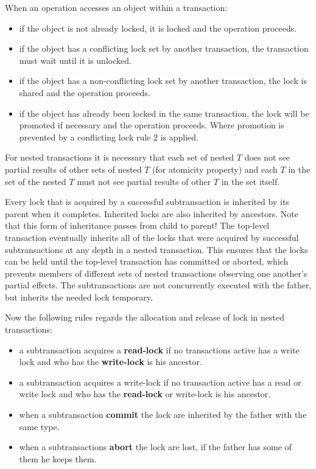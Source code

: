When an operation accesses an object within a transaction:
\begin{itemize}
	\item if the object is not already locked, it is locked and the operation proceeds.
	\item if the object has a conflicting lock set by another transaction, the transaction must wait until it is unlocked.
	\item if the object has a non-conflicting lock set by another transaction, the lock is shared and the operation proceeds.
	\item if the object has already been locked in the same transaction, the lock will be promoted if necessary and the operation proceeds. Where promotion is prevented by a conflicting lock rule $2$ is applied.
\end{itemize}

For nested transactions it is necessary that each set of nested $T$ does not see partial results of other sets of nested $T$ (for atomicity property) and each $T$ in the set of the nested $T$ must not see partial results of other $T$ in the set itself.

Every lock that is acquired by a successful subtransaction is inherited by its parent when it completes. Inherited locks are also inherited by ancestors. Note that this form of inheritance passes from child to parent! The top-level transaction eventually inherits all of the locks that were acquired by successful subtransactions at any depth in a nested transaction. This ensures that the locks can be held until the top-level transaction has committed or aborted, which prevents members of different sets of nested transactions observing one another’s partial effects. The subtransactions are not concurrently executed with the father, but inherits the needed lock temporary.

Now the following rules regards the allocation and release of lock in nested transactions:
\begin{itemize}
	\item a subtransaction acquires a \textbf{read-lock} if no transactions active has a write lock and who has the \textbf{write-lock} is his ancestor.
	\item a subtransaction acquires a write-lock if no transaction active has a read or write lock and who has the \textbf{read-lock} or write-lock is his ancestor.
	\item when a subtransaction \textbf{commit} the lock are inherited by the father with the same type.
	\item when a subtransactions \textbf{abort} the lock are lost, if the father has some of them he keeps them.
\end{itemize}


